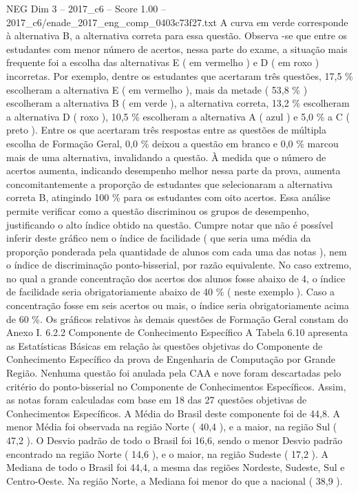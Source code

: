 \begin{textsample}{NEG Dim 3 – 2017\_c6 – Score 1.00 – 2017\_c6/enade\_2017\_eng\_comp\_0403c73f27.txt}
A curva em verde corresponde à alternativa B, a alternativa correta para essa questão.
Observa -se que entre os estudantes com menor número de acertos, nessa parte do exame, a situação mais frequente foi a escolha das alternativas E ( em vermelho ) e D ( em roxo ) incorretas.
Por exemplo, dentre os estudantes que acertaram três questões, 17,5 \% escolheram a alternativa E ( em vermelho ), mais da metade ( 53,8 \% ) escolheram a alternativa B ( em verde ), a alternativa correta, 13,2 \% escolheram a alternativa D ( roxo ), 10,5 \% escolheram a alternativa A ( azul ) e 5,0 \% a C ( preto ).
Entre os que acertaram três respostas entre as questões de múltipla escolha de Formação Geral, 0,0 \% deixou a questão em branco e 0,0 \% marcou mais de uma alternativa, invalidando a questão.
À medida que o número de acertos aumenta, indicando desempenho melhor nessa parte da prova, aumenta concomitantemente a proporção de estudantes que selecionaram a alternativa correta B, atingindo 100 \% para os estudantes com oito acertos.
Essa análise permite verificar como a questão discriminou os grupos de desempenho, justificando o alto índice obtido na questão.
Cumpre notar que não é possível inferir deste gráfico nem o índice de facilidade ( que seria uma média da proporção ponderada pela quantidade de alunos com cada uma das notas ), nem o índice de discriminação ponto-bisserial, por razão equivalente.
No caso extremo, no qual a grande concentração dos acertos dos alunos fosse abaixo de 4, o índice de facilidade seria obrigatoriamente abaixo de 40 \% ( neste exemplo ).
Caso a concentração fosse em seis acertos ou mais, o índice seria obrigatoriamente acima de 60 \%.
Os gráficos relativos às demais questões de Formação Geral constam do Anexo I. 6.2.2 Componente de Conhecimento Específico A Tabela 6.10 apresenta as Estatísticas Básicas em relação às questões objetivas do Componente de Conhecimento Específico da prova de Engenharia de Computação por Grande Região.
Nenhuma questão foi anulada pela CAA e nove foram descartadas pelo critério do ponto-bisserial no Componente de Conhecimentos Específicos.
Assim, as notas foram calculadas com base em 18 das 27 questões objetivas de Conhecimentos Específicos.
A Média do Brasil deste componente foi de 44,8.
A menor Média foi observada na região Norte ( 40,4 ), e a maior, na região Sul ( 47,2 ).
O Desvio padrão de todo o Brasil foi 16,6, sendo o menor Desvio padrão encontrado na região Norte ( 14,6 ), e o maior, na região Sudeste ( 17,2 ).
A Mediana de todo o Brasil foi 44,4, a mesma das regiões Nordeste, Sudeste, Sul e Centro-Oeste.
Na região Norte, a Mediana foi menor do que a nacional ( 38,9 ).

\end{textsample}
